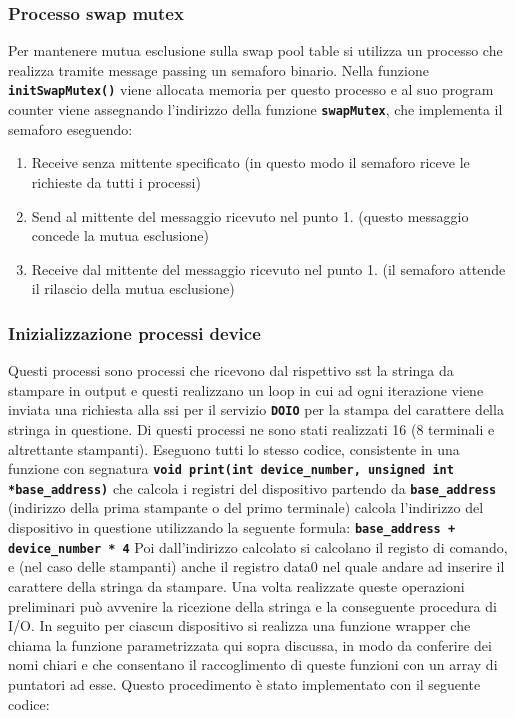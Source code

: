 \documentclass{article}
\begin{document}
\subsubsection{Processo swap mutex}
Per mantenere mutua esclusione sulla swap pool table si utilizza un processo che realizza tramite message passing un 
semaforo binario. Nella funzione \texttt{\textbf{initSwapMutex()}} viene allocata memoria per questo processo e 
al suo program counter viene assegnando l'indirizzo della funzione \texttt{\textbf{swapMutex}}, che implementa il 
semaforo eseguendo:
\begin{enumerate}
    \item Receive senza mittente specificato (in questo modo il semaforo riceve le richieste da tutti i processi) 
    \item Send al mittente del messaggio ricevuto nel punto 1. (questo messaggio concede la mutua esclusione)
    \item Receive dal mittente del messaggio ricevuto nel punto 1. (il semaforo attende il rilascio della mutua esclusione)
\end{enumerate}
\subsubsection{Inizializzazione processi device}
Questi processi sono processi che ricevono dal rispettivo sst la stringa da stampare in output e questi 
realizzano un loop in cui ad ogni iterazione viene inviata una richiesta alla ssi per il servizio 
\texttt{\textbf{DOIO}} per la stampa del carattere della stringa in questione.
Di questi processi ne sono stati realizzati 16 (8 terminali e altrettante stampanti). 
Eseguono tutti lo stesso codice, consistente in una funzione con segnatura 
\texttt{\textbf{void print(int device\_number, unsigned int *base\_address)}} che calcola i registri del 
dispositivo partendo da \texttt{\textbf{base\_address}} (indirizzo della prima stampante o del primo 
terminale) calcola l'indirizzo del dispositivo in questione utilizzando la seguente formula: \newline 
\texttt{\textbf{base\_address + device\_number * 4}} \newline
Poi dall'indirizzo calcolato si calcolano il registo di comando, e (nel caso delle stampanti) anche il 
registro data0 nel quale andare ad inserire il carattere della stringa da stampare.
Una volta realizzate queste operazioni preliminari può avvenire la ricezione della stringa e la conseguente 
procedura di I/O. \newline
In seguito per ciascun dispositivo si realizza una funzione wrapper che chiama la funzione parametrizzata 
qui sopra discussa, in modo da conferire dei nomi chiari e che consentano il raccoglimento di queste 
funzioni con un array di puntatori ad esse. Questo procedimento è stato implementato con il seguente codice:
\end{document}

